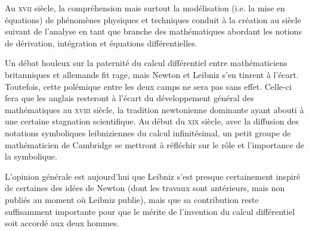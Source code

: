 \begin{histoire}%
Au \textsc{xvii} siècle, la compréhension mais surtout la modélisation (i.e. la mise en équations)
de phénomènes physiques et techniques conduit à la création au siècle suivant de
l'analyse en tant que branche des mathématiques
abordant les notions de dérivation, intégration et équations différentielles.

\medskip
{}

Un débat houleux sur la paternité du calcul différentiel entre mathématiciens britanniques et allemands
fit rage, mais Newton et Leibniz s'en tinrent à l'écart.
Toutefois, cette polémique entre les deux camps ne sera pas sans effet.
Celle-ci fera que les anglais resteront à l'écart du développement général des mathématiques
au \textsc{xviii} siècle, la tradition newtonienne dominante ayant abouti à une certaine stagnation
scientifique. Au début du \textsc{xix} siècle, avec la diffusion des notations symboliques leibniziennes
du calcul infinitésimal, un petit groupe de mathématicien de Cambridge se mettront
à réfléchir sur le rôle et l'importance de la symbolique.

\medskip
L'opinion générale est aujourd'hui que Leibniz s'est presque
certainement inspiré de certaines des idées de Newton (dont les travaux sont antérieurs, mais non publiés au moment
où Leibniz publie), mais que sa contribution reste suffisamment importante pour que le
mérite de l'invention du calcul différentiel soit accordé aux deux hommes.


\end{histoire}
